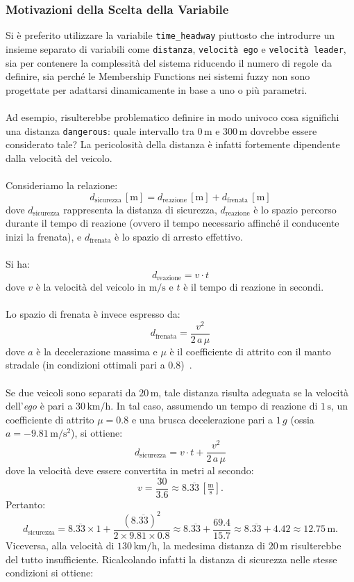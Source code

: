 \subsubsection{Motivazioni della Scelta della Variabile} 
Si è preferito utilizzare la variabile \texttt{time\_headway} piuttosto che introdurre un insieme separato di variabili come 
\texttt{distanza}, \texttt{velocità ego} e \texttt{velocità leader}, sia per contenere la complessità del sistema riducendo 
il numero di regole da definire, sia perché le Membership Functions nei sistemi fuzzy non sono progettate per adattarsi 
dinamicamente in base a uno o più parametri.
\\\\
Ad esempio, risulterebbe problematico definire in modo univoco cosa significhi una distanza \texttt{dangerous}: quale intervallo 
tra \(0\,\mathrm{m}\) e \(300\,\mathrm{m}\) dovrebbe essere considerato tale? La pericolosità della distanza è infatti fortemente 
dipendente dalla velocità del veicolo.
\\\\
Consideriamo la relazione:
\[
d_{\mathrm{sicurezza}}\,[\mathrm{m}] = d_{\mathrm{reazione}}\,[\mathrm{m}] + d_{\mathrm{frenata}}\,[\mathrm{m}]
\]
dove \(d_{\mathrm{sicurezza}}\) rappresenta la distanza di sicurezza, \(d_{\mathrm{reazione}}\) è lo spazio percorso durante il tempo di reazione (ovvero il tempo necessario affinché il conducente inizi la frenata), e \(d_{\mathrm{frenata}}\) è lo spazio di arresto effettivo.
\\\\
Si ha:
\[
d_{\mathrm{reazione}} = v \cdot t
\]
dove \(v\) è la velocità del veicolo in \(\mathrm{m/s}\) e \(t\) è il tempo di reazione in secondi.
\\\\
Lo spazio di frenata è invece espresso da:
\[
d_{\mathrm{frenata}} = \frac{v^2}{2\,a\,\mu}
\]
dove \(a\) è la decelerazione massima e \(\mu\) è il coefficiente di attrito con il manto stradale (in condizioni ottimali pari a 0.8)~\cite{distanza_di_sicurezza_youmath}.
\\\\
Se due veicoli sono separati da \(20\,\mathrm{m}\), tale distanza risulta adeguata se la velocità 
dell'\emph{ego} è pari a \(30\,\mathrm{km/h}\). In tal caso, assumendo un tempo di reazione di \(1\,\mathrm{s}\), 
un coefficiente di attrito \(\mu=0.8\) e una brusca decelerazione pari a \(1\,g\) (ossia \(a = -9.81\,\mathrm{m/s^2}\)), si ottiene:
\[
d_{\mathrm{sicurezza}} = v \cdot t + \frac{v^2}{2\,a\,\mu}
\]
dove la velocità deve essere convertita in metri al secondo:
\[
v = \frac{30}{3.6} \approx 8.\overline{33}\,\left[\tfrac{\mathrm{m}}{\mathrm{s}}\right].
\]
Pertanto:
\[
d_{\mathrm{sicurezza}} = 8.\overline{33} \times 1 + \frac{(8.\overline{33})^2}{2 \times 9.81 \times 0.8} \approx 8.\overline{33} + \frac{69.4}{15.7} \approx 8.\overline{33} + 4.42 \approx 12.75\,\mathrm{m}.
\]
Viceversa, alla velocità di \(130\,\mathrm{km/h}\), la medesima distanza di \(20\,\mathrm{m}\) risulterebbe del tutto insufficiente. 
Ricalcolando infatti la distanza di sicurezza nelle stesse condizioni si ottiene:

